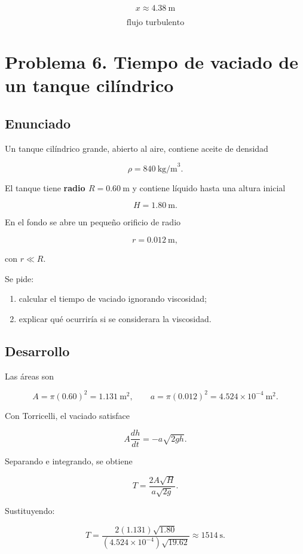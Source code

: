 \documentclass[
  letterpaper,
  DIV=11,
  numbers=noendperiod]{scrreprt}
\begin{document}
\[
\boxed{x\approx 4.38\ \text{m}}
\]

\[
\boxed{\text{flujo turbulento}}
\]

\chapter{Problema 6. Tiempo de vaciado de un tanque
cilíndrico}\label{problema-6.-tiempo-de-vaciado-de-un-tanque-ciluxedndrico}

\section{Enunciado}\label{enunciado-5}

Un tanque cilíndrico grande, abierto al aire, contiene aceite de
densidad

\[
\rho = 840\ \text{kg/m}^3.
\]

El tanque tiene \textbf{radio \(R=0.60\ \text{m}\)} y contiene líquido
hasta una altura inicial

\[
H=1.80\ \text{m}.
\]

En el fondo se abre un pequeño orificio de radio

\[
r=0.012\ \text{m},
\]

con \(r\ll R\).

Se pide:

\begin{enumerate}
\def\labelenumi{\alph{enumi})}
\item
  calcular el tiempo de vaciado ignorando viscosidad;
\item
  explicar qué ocurriría si se considerara la viscosidad.
\end{enumerate}

\section{Desarrollo}\label{desarrollo-3}

Las áreas son

\[
A=\pi(0.60)^2=1.131\ \text{m}^2,
\qquad
a=\pi(0.012)^2=4.524\times10^{-4}\ \text{m}^2.
\]

Con Torricelli, el vaciado satisface

\[
A\frac{dh}{dt}=-a\sqrt{2gh}.
\]

Separando e integrando, se obtiene

\[
T = \frac{2A\sqrt{H}}{a\sqrt{2g}}.
\]

Sustituyendo:

\[
T = \frac{2(1.131)\sqrt{1.80}}{(4.524\times10^{-4})\sqrt{19.62}} \approx 1514\ \text{s}.
\]
\end{document}
